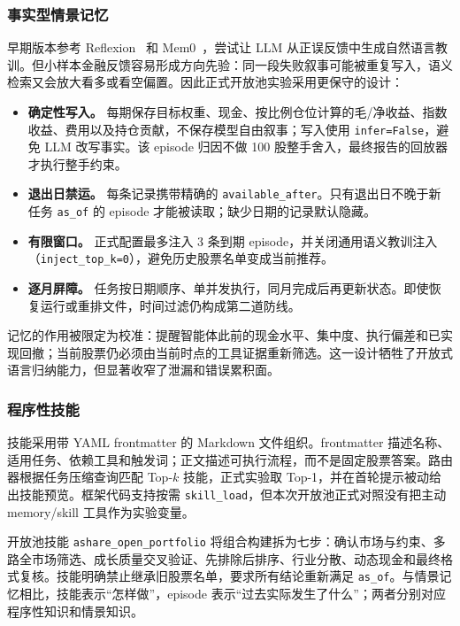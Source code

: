 \documentclass[11pt]{article}
\begin{document}
\subsubsection{事实型情景记忆}
\label{sec:memory}

早期版本参考 Reflexion~\citep{shinn2023reflexion} 和 Mem0~\citep{mem0}，尝试让 LLM 从正误反馈中生成自然语言教训。但小样本金融反馈容易形成方向先验：同一段失败叙事可能被重复写入，语义检索又会放大看多或看空偏置。因此正式开放池实验采用更保守的设计：
\begin{itemize}
    \item \textbf{确定性写入。} 每期保存目标权重、现金、按比例仓位计算的毛/净收益、指数收益、费用以及持仓贡献，不保存模型自由叙事；写入使用 \texttt{infer=False}，避免 LLM 改写事实。该 episode 归因不做 100 股整手舍入，最终报告的回放器才执行整手约束。
    \item \textbf{退出日禁运。} 每条记录携带精确的 \texttt{available\_after}。只有退出日不晚于新任务 \texttt{as\_of} 的 episode 才能被读取；缺少日期的记录默认隐藏。
    \item \textbf{有限窗口。} 正式配置最多注入 3 条到期 episode，并关闭通用语义教训注入（\texttt{inject\_top\_k=0}），避免历史股票名单变成当前推荐。
    \item \textbf{逐月屏障。} 任务按日期顺序、单并发执行，同月完成后再更新状态。即使恢复运行或重排文件，时间过滤仍构成第二道防线。
\end{itemize}

记忆的作用被限定为校准：提醒智能体此前的现金水平、集中度、执行偏差和已实现回撤；当前股票仍必须由当前时点的工具证据重新筛选。这一设计牺牲了开放式语言归纳能力，但显著收窄了泄漏和错误累积面。

\subsubsection{程序性技能}
\label{sec:skill}

技能采用带 YAML frontmatter 的 Markdown 文件组织。frontmatter 描述名称、适用任务、依赖工具和触发词；正文描述可执行流程，而不是固定股票答案。路由器根据任务压缩查询匹配 Top-$k$ 技能，正式实验取 Top-1，并在首轮提示被动给出技能预览。框架代码支持按需 \texttt{skill\_load}，但本次开放池正式对照没有把主动 memory/skill 工具作为实验变量。

开放池技能 \texttt{ashare\_open\_portfolio} 将组合构建拆为七步：确认市场与约束、多路全市场筛选、成长质量交叉验证、先排除后排序、行业分散、动态现金和最终格式复核。技能明确禁止继承旧股票名单，要求所有结论重新满足 \texttt{as\_of}。与情景记忆相比，技能表示``怎样做''，episode 表示``过去实际发生了什么''；两者分别对应程序性知识和情景知识。
\end{document}
